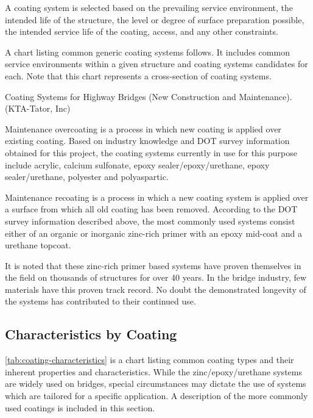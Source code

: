 A coating system is selected based on the prevailing service environment, the intended life of the structure, the
level or degree of surface preparation possible, the intended service life of the coating, access, and any other
constraints.

A chart listing common generic coating systems follows. It includes common service environments within a
given structure and coating systems candidates for each. Note that this chart represents a cross-section of coating
systems.

\begin{table}
  \caption{Coating Systems for Highway Bridges (New Construction and Maintenance). (KTA-Tator, Inc)}
  \label{tab:coating-system-highway-bridges}
\end{table}

Maintenance overcoating is a process in which new coating is applied over existing coating. Based on industry
knowledge and DOT survey information obtained for this project, the coating systems currently in use for this
purpose include acrylic, calcium sulfonate, epoxy sealer/epoxy/urethane, epoxy sealer/urethane, polyester and
polyaspartic.

Maintenance recoating is a process in which a new coating system is applied over a surface from which all old
coating has been removed. According to the DOT survey information described above, the most commonly used
systems consist either of an organic or inorganic zinc-rich primer with an epoxy mid-coat and a urethane topcoat.

It is noted that these zinc-rich primer based systems have proven themselves in the field on thousands of
structures for over 40 years. In the bridge industry, few materials have this proven track record. No doubt the
demonstrated longevity of the systems has contributed to their continued use.

\subsection{Characteristics by Coating}
\cref{tab:coating-characteristics} is a chart listing common coating types and their inherent properties and characteristics. While the
zinc/epoxy/urethane systems are widely used on bridges, special circumstances may dictate the use of systems which
are tailored for a specific application. A description of the more commonly used coatings is included in this section.


